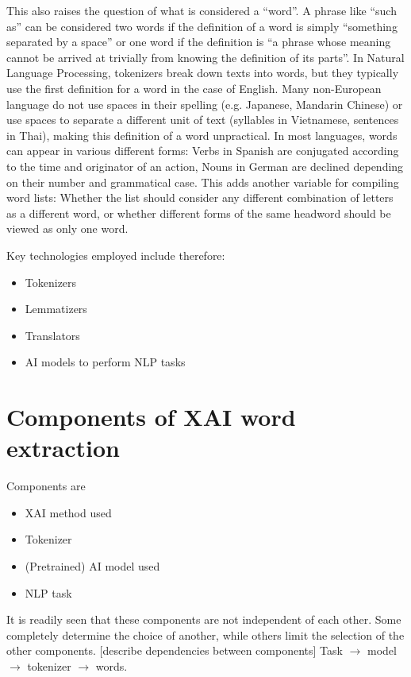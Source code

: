 \begin{description}
	      This also raises the question of what is considered a “word”.
	      A phrase like “such as” can be considered two words if the definition of a word is simply “something separated by a space” or one word if the definition is “a phrase whose meaning cannot be arrived at trivially from knowing the definition of its parts”.
	      In Natural Language Processing, tokenizers break down texts into words, but they typically use the first definition for a word in the case of English.
	      Many non-European language do not use spaces in their spelling (e.g. Japanese, Mandarin Chinese) or use spaces to separate a different unit of text (syllables in Vietnamese, sentences in Thai), making this definition of a word unpractical.
	      In most languages, words can appear in various different forms: Verbs in Spanish are conjugated according to the time and originator of an action, Nouns in German are declined depending on their number and grammatical case.
	      This adds another variable for compiling word lists: Whether the list should consider any different combination of letters as a different word, or whether different forms of the same headword should be viewed as only one word.
\end{description}

Key technologies employed include therefore:
\begin{itemize}
	\item Tokenizers
	\item Lemmatizers
	\item Translators
	\item AI models to perform NLP tasks
\end{itemize}




\section{Components of XAI word extraction}
Components are
\begin{itemize}
	\item XAI method used
	\item Tokenizer
	\item (Pretrained) AI model used
	\item NLP task
\end{itemize}

It is readily seen that these components are not independent of each other.
Some completely determine the choice of another, while others limit the selection of the other components.
	[describe dependencies between components]
Task $\rightarrow$ model $\rightarrow$ tokenizer $\rightarrow$ words.

